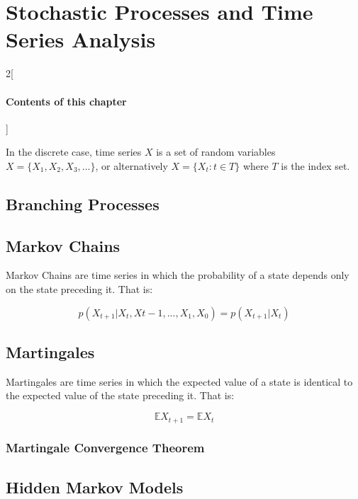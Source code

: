 \chapter{Stochastic Processes and Time Series Analysis}

\begin{multicols}{2}[\subsubsection*{Contents of this chapter}]
\end{multicols}

In the discrete case, time series $X$ is a set of random variables $X = \{X_1, X_2, X_3,...\}$, or alternatively $X = \{X_t: t\in T\}$ where $T$ is the index set. 

\section{Branching Processes}

\section{Markov Chains}
Markov Chains are time series in which the probability of a state depends only on the state preceding it. That is:

\begin{equation}
p(X_{t+1}|X_t, X{t-1},...,X_{1},X_0) = p(X_{t+1}|X_t)
\end{equation}



\section{Martingales}
Martingales are time series in which the expected value of a state is identical to the expected value of the state preceding it. That is:

\begin{equation}
\mathbb{E}X_{t+1} = \mathbb{E}X_{t}
\end{equation}


\subsection{Martingale Convergence Theorem}

\section{Hidden Markov Models}

